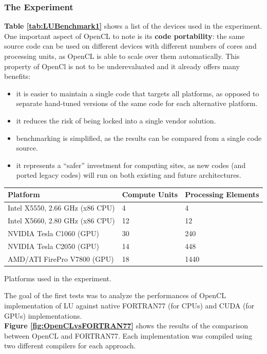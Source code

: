 \subsubsection{The Experiment}

\textbf{Table \ref{tab:LUBenchmark1}} shows a list of the devices used in the experiment. One important aspect of OpenCL to note is its \textbf{code portability}: the same source code can be used on different devices with different numbers of cores and processing units, as OpenCL is able to scale over them automatically. This property of OpenCl is not to be underevaluated and it already offers many benefits:\\

\begin{itemize}
	\item it is easier to maintain a single code that targets all platforms, as opposed to separate hand-tuned versions of the same code for each alternative platform.
	\item it reduces the risk of being locked into a single vendor solution.
	\item benchmarking is simplified, as the results can be compared from a single code source.
	\item it represents a ``safer'' investment for computing sites, as new codes (and ported legacy codes) will run on both existing and future architectures.
\end{itemize}

\begin{tablehere}
{\footnotesize
\begin{tabular}{|p{}|p{}|p{}|}\hline
\textbf{Platform} & \textbf{Compute Units} & \textbf{Processing Elements} \\ \hline
Intel X5550, 2.66 GHz (x86 CPU) & 4 & 4 \\ \hline
Intel X5660, 2.80 GHz (x86 CPU) & 12 & 12 \\ \hline
NVIDIA Tesla C1060 (GPU) & 30 & 240 \\ \hline
NVIDIA Tesla C2050 (GPU) & 14 & 448 \\ \hline
AMD/ATI FirePro V7800 (GPU) & 18 & 1440 \\ \hline
\end{tabular}}
  \caption{Platforms used in the experiment.\\}
	\label{tab:LUBenchmark1}
\end{tablehere}

The goal of the first tests was to analyze the performances of OpenCL implementation of LU against native FORTRAN77 (for CPUs) and CUDA (for GPUs) implementations.\\ \textbf{Figure \ref{fig:OpenCLvsFORTRAN77}} shows the results of the comparison between OpenCL and FORTRAN77. Each implementation was compiled using two different compilers for each approach.

